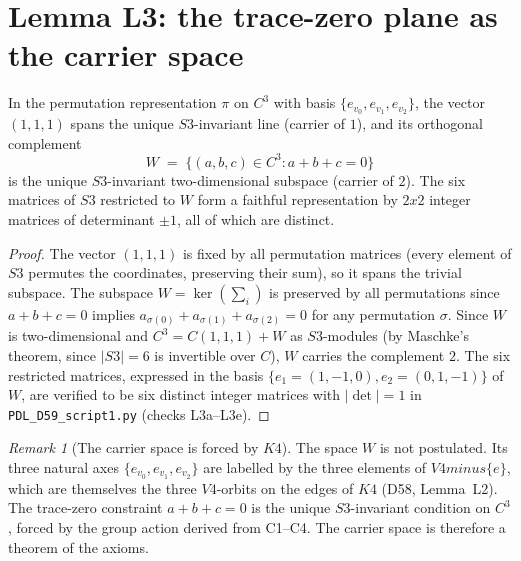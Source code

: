 \documentclass[11pt,a4paper]{article}
\def\Vfour{V4}%
\def\Sthree{S3}%
\def\Kfour{K4}%
\def\times{x}%
\def\setminus{ minus }%
\def\oplus{+}%
\def\mathbb#1{#1}%
\def\mathbf#1{#1}%
\newenvironment{lemmabox}[1][]{%
  \begin{tcolorbox}[lemmastyle,title={Lemma\ifx\relax#1\relax\else: #1\fi}]}{\end{tcolorbox}}
\theoremstyle{plain}
\theoremstyle{definition}
\theoremstyle{remark}
\newtheorem{remark}[theorem]{Remark}
\newcommand{\Kfour}{K_4}
\newcommand{\Vfour}{V_4}
\newcommand{\Sthree}{S_3}
\begin{document}
\section{Lemma L3: the trace-zero plane as the carrier space}
\label{sec:L3}

\begin{lemmabox}[L3 --- The trace-zero plane \texorpdfstring{$W$}{W} is the carrier of \texorpdfstring{$\mathbf{2}$}{2}]
\label{lem:L3}
In the permutation representation $\pi$ on $\mathbb{C}^3$ with basis $\{e_{v_0}, e_{v_1}, e_{v_2}\}$, the vector $(1,1,1)$ spans the unique $\Sthree$-invariant line (carrier of $\mathbf{1}$), and its orthogonal complement
\[
W \;=\; \{(a, b, c) \in \mathbb{C}^3 : a + b + c = 0\}
\]
is the unique $\Sthree$-invariant two-dimensional subspace (carrier of $\mathbf{2}$). The six matrices of $\Sthree$ restricted to $W$ form a faithful representation by $2\times 2$ integer matrices of determinant $\pm 1$, all of which are distinct.
\end{lemmabox}

\begin{proof}
The vector $(1,1,1)$ is fixed by all permutation matrices (every element of $\Sthree$ permutes the coordinates, preserving their sum), so it spans the trivial subspace. The subspace $W = \ker(\sum_i)$ is preserved by all permutations since $a + b + c = 0$ implies $a_{\sigma(0)} + a_{\sigma(1)} + a_{\sigma(2)} = 0$ for any permutation $\sigma$. Since $W$ is two-dimensional and $\mathbb{C}^3 = \mathbb{C}(1,1,1) \oplus W$ as $\Sthree$-modules (by Maschke's theorem, since $|\Sthree| = 6$ is invertible over $\mathbb{C}$), $W$ carries the complement $\mathbf{2}$. The six restricted matrices, expressed in the basis $\{e_1 = (1,-1,0), e_2 = (0,1,-1)\}$ of $W$, are verified to be six distinct integer matrices with $|\det| = 1$ in \texttt{PDL\_D59\_script1.py} (checks L3a--L3e).
\end{proof}

\begin{remark}[The carrier space is forced by $\Kfour$]
The space $W$ is not postulated. Its three natural axes $\{e_{v_0}, e_{v_1}, e_{v_2}\}$ are labelled by the three elements of $\Vfour \setminus \{e\}$, which are themselves the three $\Vfour$-orbits on the edges of $\Kfour$ (D58, Lemma~L2). The trace-zero constraint $a + b + c = 0$ is the unique $\Sthree$-invariant condition on $\mathbb{C}^3$, forced by the group action derived from C1--C4. The carrier space is therefore a theorem of the axioms.
\end{remark}
\end{document}
